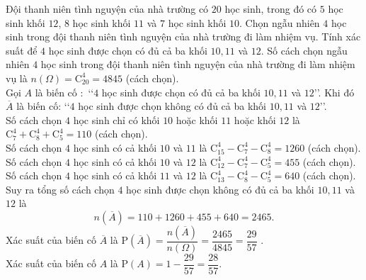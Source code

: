 \begin{vd}
	Đội thanh niên tình nguyện của nhà trường có $20$ học sinh, trong đó có $5$ học sinh khối $12$, $8$ học sinh khối $11$ và $7$ học sinh khối $10$. Chọn ngẫu nhiên $4$ học sinh trong đội thanh  niên tình nguyện của nhà trường đi làm nhiệm vụ. Tính xác suất để $4$ học sinh được chọn có đủ cả ba khối $10,11$ và $12$.
	\loigiai
	{
		Số cách chọn ngẫu nhiên $4$ học sinh trong đội thanh  niên tình nguyện của nhà trường đi làm nhiệm vụ là $n(\Omega)=\mathrm{C}_{20}^4=4845$ (cách chọn).\\
		Gọi $A$ là biến cố $\colon$ \lq\lq $4$ học sinh được chọn có đủ cả ba khối $10,11$ và $12$\rq\rq. Khi đó $\overline{A}$ là biến cố: \lq\lq $4$ học sinh được chọn không có đủ cả ba khối $10,11$ và $12$\rq\rq.\\
		Số cách chọn $4$ học sinh chỉ có khối $10$ hoặc khối $11$ hoặc khối $12$ là $\mathrm{C}_7^4+\mathrm{C}_8^4+\mathrm{C}_5^4=110$ (cách chọn).\\
		Số cách chọn $4$ học sinh có cả khối $10$ và $11$ là $\mathrm{C}_{15}^4 - \mathrm{C}_7^4 - \mathrm{C}_8^4=1260$ (cách chọn).\\
		Số cách chọn $4$ học sinh có cả khối $10$ và $12$ là $\mathrm{C}_{12}^4 - \mathrm{C}_7^4 - \mathrm{C}_5^4=455$ (cách chọn).\\
		Số cách chọn $4$ học sinh có cả khối $11$ và $12$ là $\mathrm{C}_{13}^4 - \mathrm{C}_8^4-\mathrm{C}_5^4=640$ (cách chọn).\\
		Suy ra tổng số cách chọn $4$ học sinh được chọn không có đủ cả ba khối $10,11$ và $12$ là
		\[n\left(\overline{A}\right)=110+1260+455+640=2465.\]
		Xác suất của biến cố $\overline{A}$ là $\mathrm{P}\left(\overline{A}\right)=\dfrac{n\left(\overline{A}\right)}{n(\Omega)}=\dfrac{2465}{4845}=\dfrac{29}{57}$ .\\
		Xác suất của biến cố $A$ là $\mathrm{P}(A)=1-\dfrac{29}{57}=\dfrac{28}{57}$.
	}
\end{vd}

